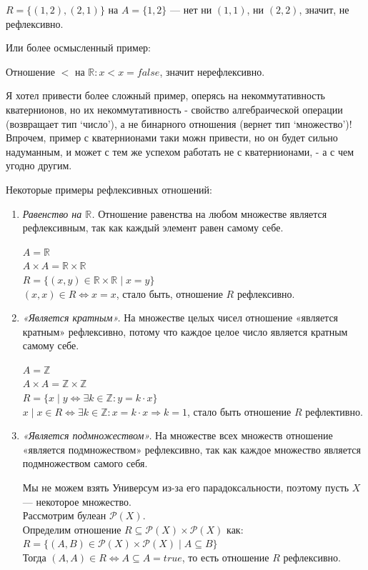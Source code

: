 \documentclass{book}
\begin{document}
\begin{enumerate}[label=\arabic*., parsep=4pt, itemsep=4pt, topsep=4pt, partopsep=0pt]
\begin{enumerate}[label=\arabic*., parsep=4pt, itemsep=4pt, topsep=4pt, partopsep=0pt]
$R=\{(1,2),(2,1)\}$ на $A=\{1,2\}$ — нет ни $(1,1)$, ни $(2,2)$, значит, не рефлексивно.

Или более осмысленный пример:

Отношение $<$ на $\mathbb{R}: x<x = false$, значит нерефлексивно.

Я хотел привести более сложный пример, оперясь на некоммутативность кватернионов, но их некоммутативность - свойство алгебраической операции (возвращает тип `число'), а не бинарного отношения (вернет тип `множество')! Впрочем, пример с кватернионами таки можн привести, но он будет сильно надуманным, и может с тем же успехом работать не с кватернионами, - а с чем угодно другим.

Некоторые примеры рефлексивных отношений:

\begin{enumerate}[label=\arabic*., parsep=4pt, itemsep=4pt, topsep=4pt, partopsep=0pt]

\item \textit{Равенство на $\mathbb{R}$.} Отношение равенства на любом множестве является рефлексивным, так как каждый элемент равен самому себе.

$A = \mathbb{R}$\\
$A \times A = \mathbb{R} \times \mathbb{R}$\\
$R = \{(x, y) \in \mathbb{R} \times \mathbb{R} \mid x = y\}$\\
$(x, x) \in R \Leftrightarrow x = x$, стало быть, отношение $R$ рефлексивно.

\item \textit{«Является кратным».} На множестве целых чисел отношение «является кратным» рефлексивно, потому что каждое целое число является кратным самому себе.

$A = \mathbb{Z}$\\
$A \times A = \mathbb{Z} \times \mathbb{Z}$\\
$R = \{x \mid y \Leftrightarrow \exists k \in \mathbb{Z}: y = k \cdot x\}$\\
$x \mid x \in R \Leftrightarrow \exists k \in \mathbb{Z}: x = k \cdot x \Rightarrow k = 1$, стало быть отношение $R$ рефлективно.

\item \textit{«Является подмножеством».} На множестве всех множеств отношение «является подмножеством» рефлексивно, так как каждое множество является подмножеством самого себя.

Мы не можем взять Универсум из-за его парадоксальности, поэтому пусть $X$ — некоторое множество. \\
Рассмотрим булеан $\mathcal{P}(X)$.\\
Определим отношение $R \subseteq \mathcal{P}(X) \times \mathcal{P}(X)$ как:\\
$R = \{(A, B) \in \mathcal{P}(X) \times \mathcal{P}(X) \mid A \subseteq B\}$\\
Тогда $(A, A) \in R \Leftrightarrow A \subseteq A = true$, то есть отношение $R$ рефлексивно.


\end{enumerate}
\end{enumerate}
\end{enumerate}
\end{document}

